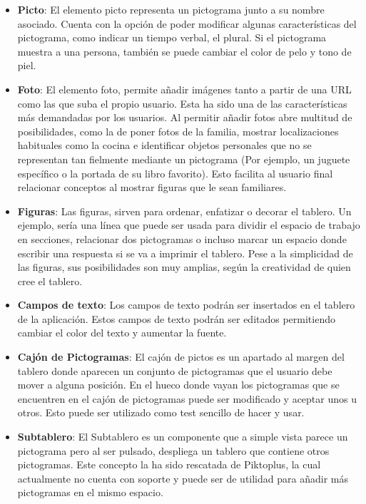 \begin{itemize}
	
	
	\item \textbf{Picto}: El elemento picto representa un pictograma junto a su nombre asociado. Cuenta con la opción de poder modificar algunas características del pictograma, como indicar un tiempo verbal, el plural. Si el pictograma muestra a una persona, también se puede cambiar el color de pelo y tono de piel.
	
	\item \textbf{Foto}: El elemento foto, permite añadir imágenes tanto a partir de una URL como las que suba el propio usuario. Esta ha sido una de las características más demandadas por los usuarios. Al permitir añadir fotos abre multitud de posibilidades, como la de poner fotos de la familia, mostrar localizaciones habituales como la cocina e identificar objetos personales que no se representan tan fielmente mediante un pictograma (Por ejemplo, un juguete específico o la portada de su  libro favorito). Esto facilita al usuario final relacionar conceptos al mostrar figuras que le sean familiares.
	
	\item \textbf{Figuras}: Las figuras, sirven para ordenar, enfatizar o decorar el tablero. Un ejemplo, sería una línea que puede ser usada para dividir el espacio de trabajo en secciones, relacionar dos pictogramas o incluso marcar un espacio donde escribir una respuesta si se va a imprimir el tablero. Pese a la simplicidad de las figuras, sus posibilidades son muy amplias, según  la creatividad de quien cree el tablero.
	
	\item \textbf{Campos de texto}: Los campos de texto podrán ser insertados en el tablero de la aplicación. Estos campos de texto podrán ser editados permitiendo cambiar el color del texto y aumentar la fuente.
	
	\item \textbf{Cajón de Pictogramas}: El cajón de pictos es un apartado al margen del tablero donde aparecen un conjunto de pictogramas que el usuario debe mover a alguna posición. En el hueco donde vayan los pictogramas que se encuentren en el cajón de pictogramas puede ser modificado y aceptar unos u otros. Esto puede ser utilizado como test sencillo de hacer y usar.
	
	\item \textbf{Subtablero}: El Subtablero es un componente que a simple vista parece un pictograma pero al ser pulsado, despliega un tablero que contiene otros pictogramas. Este concepto la ha sido rescatada de Piktoplus, la cual actualmente no cuenta con soporte y puede ser de utilidad para añadir más pictogramas en el mismo espacio.
\end{itemize}

